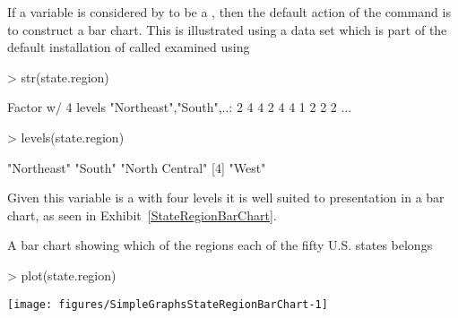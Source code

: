 If a variable is considered by \R{} to be a , then the default action of the  command is to construct a bar chart. This is illustrated using a data set which is part of the default installation of \R{} called  examined using 
\begin{Schunk}
\begin{Sinput}
> str(state.region) 
\end{Sinput}
\begin{Soutput}
 Factor w/ 4 levels "Northeast","South",..: 2 4 4 2 4 4 1 2 2 2 ...
\end{Soutput}
\begin{Sinput}
> levels(state.region) 
\end{Sinput}
\begin{Soutput}
[1] "Northeast"     "South"         "North Central"
[4] "West"         
\end{Soutput}
\end{Schunk}
Given this variable is a  with four levels it is well suited to presentation in a bar chart, as seen in Exhibit~\ref{StateRegionBarChart}. 
 
\begin{exhibit} 
\begin{center} 
\caption{A bar chart showing which of the regions each of the fifty U.S. states belongs} 
\label{StateRegionBarChart} 
\begin{Schunk}
\begin{Sinput}
> plot(state.region) 
\end{Sinput}

\texttt{[image: figures/SimpleGraphsStateRegionBarChart-1]} \end{Schunk}
\end{center} 
\end{exhibit} 
 
